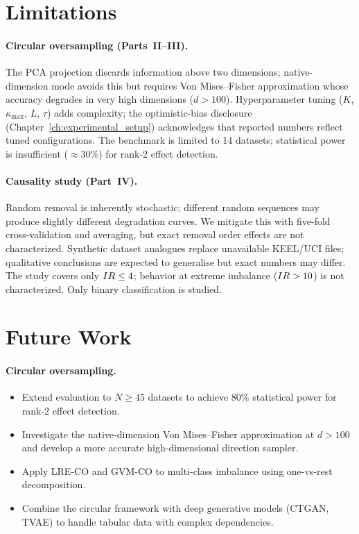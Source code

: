 \section{Limitations}
\label{sec:conc:limitations}

\paragraph{Circular oversampling (Parts~II--III).}
The PCA projection discards information above two dimensions; native-dimension mode avoids this but requires Von Mises--Fisher approximation whose accuracy degrades in very high dimensions ($d > 100$).
Hyperparameter tuning ($K$, $\kappa_{\max}$, $L$, $\tau$) adds complexity; the optimistic-bias disclosure (Chapter~\ref{ch:experimental_setup}) acknowledges that reported numbers reflect tuned configurations.
The benchmark is limited to 14 datasets; statistical power is insufficient ($\approx 30\%$) for rank-2 effect detection.

\paragraph{Causality study (Part~IV).}
Random removal is inherently stochastic; different random sequences may produce slightly different degradation curves. We mitigate this with five-fold cross-validation and averaging, but exact removal order effects are not characterized.
Synthetic dataset analogues replace unavailable KEEL/UCI files; qualitative conclusions are expected to generalise but exact numbers may differ.
The study covers only $IR \leq 4$; behavior at extreme imbalance ($IR > 10$) is not characterized.
Only binary classification is studied.


\section{Future Work}
\label{sec:conc:future}

\paragraph{Circular oversampling.}
\begin{itemize}[leftmargin=*]
  \item Extend evaluation to $N \geq 45$ datasets to achieve 80\% statistical power for rank-2 effect detection.
  \item Investigate the native-dimension Von Mises--Fisher approximation at $d > 100$ and develop a more accurate high-dimensional direction sampler.
  \item Apply LRE-CO and GVM-CO to multi-class imbalance using one-vs-rest decomposition.
  \item Combine the circular framework with deep generative models (CTGAN, TVAE) to handle tabular data with complex dependencies.
\end{itemize}

